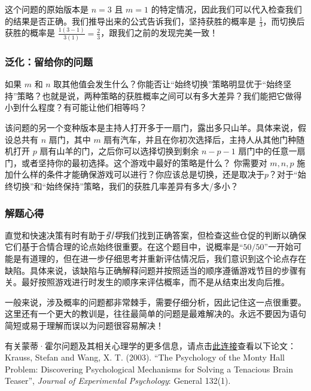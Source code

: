 这个问题的原始版本是 $n = 3$ 且 $m = 1$ 的特定情况，因此我们可以代入检查我们的结果是否正确。我们推导出来的公式告诉我们，坚持获胜的概率是 $\frac{1}{3}$，而切换后获胜的概率是 $\frac{1(3-1)}{3(1)} = \frac{2}{3}$，跟我们之前的发现完美一致！

\subsubsection*{泛化：留给你的问题}

如果 $m$ 和 $n$ 取其他值会发生什么？你能否让“始终切换”策略明显优于“始终坚持”策略？也就是说，两种策略的获胜概率之间可以有多大差异？我们能把它做得小到什么程度？有可能让他们相等吗？

该问题的另一个变种版本是主持人打开多于一扇门，露出多只山羊。具体来说，假设总共有 $n$ 扇门，其中 $m$ 扇有汽车，并且在你初次选择后，主持人从其他门种随机打开 $p$ 扇有山羊的门，之后你可以选择切换到剩余 $n-p-1$ 扇门中的任意一扇门，或者坚持你的最初选择。这个游戏中最好的策略是什么？ 你需要对 $m,n,p$ 施加什么样的条件才能确保游戏可以进行？你应该总是切换，还是取决于$p$？对于“始终切换”和“始终保持”策略，我们的获胜几率差异有多大/多小？

\subsubsection*{解题心得}

直觉和快速决策有时有助于\textit{引导}我们找到正确答案，但检查这些仓促的判断以确保它们基于合情合理的论点始终很重要。在这个题目中，说概率是“$50/50$”一开始可能是有道理的，但在进一步仔细思考并重新评估情况后，我们意识到这个论点存在缺陷。具体来说，该缺陷与正确解释问题并按照适当的顺序遵循游戏节目的步骤有关。最好按照游戏进行时发生的顺序来评估概率，而不是从结束出发向后推。

一般来说，涉及概率的问题都非常棘手，需要仔细分析，因此记住这一点很重要。这里还有一个更大的教训是，往往最简单的问题是最难解决的。永远不要因为语句简短或易于理解而误以为问题很容易解决！

有关蒙蒂·霍尔问题及其相关心理学的更多信息，请点击\href{http://www.usd.edu/~xtwang/Papers/MontyHallPaper.pdf}{此连接}查看以下论文： Krauss, Stefan and Wang, X. T. (2003). “The Psychology of the Monty Hall Problem: Discovering Psychological Mechanisms for Solving a Tenacious Brain Teaser”, \textit{Journal of Experimental Psychology}: General 132(1).
